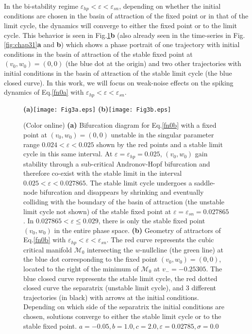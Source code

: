 In the bi-stability regime $\varepsilon_{hp}<\varepsilon<\varepsilon_{sn}$,
depending on whether the initial conditions are chosen in the basin of attraction of the fixed point or in that of the limit
cycle, the dynamics will converge to either the fixed point or to the
limit cycle. This behavior is seen in Fig.\ref{fig:chap32}\textbf{b} (also already seen in the time-series in Fig.\ref{fig:chap31}\textbf{a} and \textbf{b})
which shows a phase portrait of one trajectory with initial
conditions in the basin of attraction of the stable fixed
point at $(v_0,w_0)=(0,0)$ (the blue dot at the origin) and two other trajectories with 
initial conditions in the basin of attraction of the stable limit cycle
(the blue closed curve). In this work, we will focus on weak-noise effects on the 
spiking dynamics of Eq.\eqref{fn0a} with
$\varepsilon_{hp}<\varepsilon<\varepsilon_{sn}$.
\begin{figure}%
\begin{center}
\textbf{(a)}\texttt{[image: Fig3a.eps]}
\textbf{(b)}\texttt{[image: Fig3b.eps]}
\caption{(Color online) \textbf{(a)} Bifurcation diagram for Eq.\eqref{fn0b} with a fixed
point at $(v_0,w_0)=(0,0)$ unstable in the singular parameter range 
$0.024<\varepsilon<0.025$ shown by the red points
and a stable limit cycle in this same interval. At
$\varepsilon=\varepsilon_{hp}=0.025$, $(v_0,w_0)$ gain stability
through a sub-critical Andronov-Hopf bifurcation and therefore
co-exist with the stable limit in the interval
$0.025<\varepsilon<0.027865$.  The stable limit cycle undergoes
a saddle-node bifurcation and disappears by shrinking and
eventually colliding with the boundary of the basin of attraction
(the unstable limit cycle not shown) of the stable fixed point at
$\varepsilon=\varepsilon_{sn}=0.027865$. In
$0.027865<\varepsilon\leq0.029$, there is only the stable fixed
point $(v_0,w_0)$ in the entire phase space. \textbf{(b)} Geometry of attractors of
Eq.\eqref{fn0b} with $\varepsilon_{hp}<\varepsilon<\varepsilon_{sn}$. 
The red curve represents the cubic critical
manifold $\mathcal{M}_0$ intersecting the $w$-nullcline (the green
line) at the blue dot corresponding to the fixed point $(v_0,w_0)=(0,0)$, located
to the right of the minimum of $\mathcal{M}_0$ at $v_-=-0.25305$. The blue closed curve
represents the stable limit cycle, the red dotted closed curve the
separatrix (unstable limit cycle), and 3 different trajectories (in black) with arrows at
the initial conditions. Depending on which side of the separatrix
the initial conditions are chosen, solutions converge to either the
stable limit cycle or to the stable fixed point. $a=-0.05, b=1.0,
c=2.0, \varepsilon=0.02785, \sigma=0.0$} \label{fig:chap32}
\end{center}
\end{figure}

